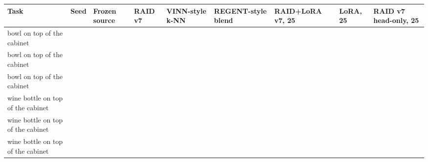 \documentclass[11pt,a4paper]{article}
\begin{document}
{\def\LTcaptype{none} %
{\small
\begin{longtable}[]{@{}
  >{\raggedright\arraybackslash}p{}
  >{\raggedright\arraybackslash}p{}
  >{\raggedright\arraybackslash}p{}
  >{\raggedright\arraybackslash}p{}
  >{\raggedright\arraybackslash}p{}
  >{\raggedright\arraybackslash}p{}
  >{\raggedright\arraybackslash}p{}
  >{\raggedright\arraybackslash}p{}
  >{\raggedright\arraybackslash}p{}@{}}
\toprule\noalign{}
\begin{minipage}[b]{\linewidth}\raggedright
Task
\end{minipage} & \begin{minipage}[b]{\linewidth}\raggedright
Seed
\end{minipage} & \begin{minipage}[b]{\linewidth}\raggedright
Frozen source
\end{minipage} & \begin{minipage}[b]{\linewidth}\raggedright
RAID v7
\end{minipage} & \begin{minipage}[b]{\linewidth}\raggedright
VINN-style k-NN
\end{minipage} & \begin{minipage}[b]{\linewidth}\raggedright
REGENT-style blend
\end{minipage} & \begin{minipage}[b]{\linewidth}\raggedright
RAID+LoRA v7, 25
\end{minipage} & \begin{minipage}[b]{\linewidth}\raggedright
LoRA, 25
\end{minipage} & \begin{minipage}[b]{\linewidth}\raggedright
RAID v7 head-only, 25
\end{minipage} \\
\midrule\noalign{}
\endhead
\bottomrule\noalign{}
\endlastfoot
bowl on top of the cabinet & 42 & 0.640 & 0.324 & 0.374 & 0.408 & 0.252 & 0.279 & 0.251 \\
bowl on top of the cabinet & 43 & 0.736 & 0.306 & 0.319 & 0.346 & 0.244 & 0.275 & 0.243 \\
bowl on top of the cabinet & 44 & 0.598 & 0.320 & 0.346 & 0.391 & 0.272 & 0.294 & 0.268 \\
wine bottle on top of the cabinet & 42 & 1.456 & 0.716 & 0.353 & 0.406 & 0.277 & 0.353 & 0.280 \\
wine bottle on top of the cabinet & 43 & 1.521 & 0.714 & 0.456 & 0.560 & 0.324 & 0.353 & 0.330 \\
wine bottle on top of the cabinet & 44 & 1.382 & 0.617 & 0.409 & 0.499 & 0.261 & 0.337 & 0.266 \\
\end{longtable}
}
}
\end{document}
